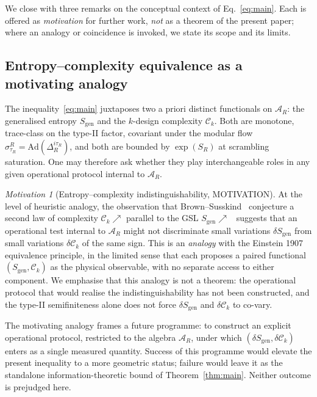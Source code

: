 \documentclass[aps,prd,superscriptaddress,nofootinbib,floatfix,10pt]{revtex4-2}
\theoremstyle{remark}
\newtheorem{motivation}{Motivation}
\newcommand{\Sgen}{S_{\mathrm{gen}}}
\newcommand{\tauR}{\tau_{R}}
\newcommand{\Ck}{\mathcal{C}_{k}}
\newcommand{\AR}{\mathcal{A}_{R}}
\begin{document}
We close with three remarks on the conceptual context of
Eq.~\eqref{eq:main}. Each is offered as \emph{motivation} for further
work, \emph{not} as a theorem of the present paper; where an analogy or
coincidence is invoked, we state its scope and its limits.

\subsection{Entropy--complexity equivalence as a motivating analogy}
\label{sec:outlook:equivalence}

The inequality~\eqref{eq:main} juxtaposes two a priori distinct
functionals on $\AR$: the generalised entropy $\Sgen$ and the
$k$-design complexity $\Ck$. Both are monotone, trace-class on the
type-II factor, covariant under the modular flow
$\sigma^{R}_{\tauR}=\mathrm{Ad}(\Delta_{R}^{i\tauR})$, and both are
bounded by $\exp(S_R)$ at scrambling saturation. One may therefore ask
whether they play interchangeable roles in any given operational
protocol internal to $\AR$.

\begin{motivation}[Entropy--complexity indistinguishability, MOTIVATION]
\label{motiv:eq}
At the level of heuristic analogy, the observation that
Brown--Susskind~\cite{BrownSusskind2018} conjecture a second law of
complexity $\Ck\nearrow$ parallel to the GSL
$\Sgen\nearrow$~\cite{Wall2011} suggests that an operational test
internal to $\AR$ might not discriminate small variations $\delta\Sgen$
from small variations $\delta\Ck$ of the same sign. This is an
\emph{analogy} with the Einstein 1907 equivalence principle, in the
limited sense that each proposes a paired functional
$(\Sgen,\Ck)$ as the physical observable, with no separate access to
either component. We emphasise that this analogy is not a theorem: the
operational protocol that would realise the indistinguishability has
not been constructed, and the type-II semifiniteness alone does not
force $\delta\Sgen$ and $\delta\Ck$ to co-vary.
\end{motivation}

The motivating analogy frames a future programme: to construct an
explicit operational protocol, restricted to the algebra $\AR$, under
which $(\delta\Sgen,\delta\Ck)$ enters as a single measured quantity.
Success of this programme would elevate the present inequality to a
more geometric status; failure would leave it as the standalone
information-theoretic bound of Theorem~\ref{thm:main}. Neither outcome
is prejudged here.
\end{document}
